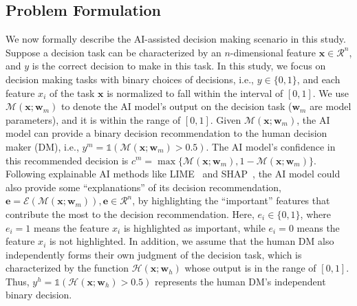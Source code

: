 \documentclass[letterpaper]{article} %
\begin{document}
\subsection{Problem Formulation}
We now formally describe the AI-assisted decision making scenario in this study. Suppose a decision task can be characterized by an $n$-dimensional feature $\bm{x} \in \mathcal{R}^{n}$, and $y$ is the correct decision to make in this task. In this study, we focus on decision making tasks with binary choices of decisions, i.e., $y \in \{0,1\}$, and each feature $x_i$ of the task $\bm{x}$ is normalized to fall within the interval of $[0,1]$. We use $\mathcal{M}(\bm{x};\bm{w}_m)$ to denote the AI model's output on the decision task ($\bm{w}_m$ are model parameters), and it is within the range of $[0,1]$. Given $\mathcal{M}(\bm{x};\bm{w}_m)$, the AI model can provide a binary decision recommendation to the human decision maker (DM), i.e., $y^m = \mathds{1}( \mathcal{M}(\bm{x};\bm{w}_m) > 0.5 )$. 
 The AI model's confidence in this recommended decision is $c^m = \max \{\mathcal{M}(\bm{x};\bm{w}_m), 1-\mathcal{M}(\bm{x};\bm{w}_m)\}$. Following explainable AI methods like LIME~\cite{ribeiro2016should} and SHAP~\cite{lundberg2017unified}, the AI model could also provide some ``explanations'' of its decision recommendation, $\bm{e} = \mathcal{E}(\mathcal{M}(\bm{x};\bm{w}_m)), \bm{e} \in \mathcal{R}^{n}$, by  
 highlighting the ``important'' features that contribute the most to the decision recommendation. Here, $e_i \in \{0,1\}$, where $e_i = 1$ means the feature $x_i$ is highlighted as important, while $e_i = 0$ means the feature $x_i$ is not highlighted.  In addition, we assume that the human DM also independently forms their own judgment of the decision task, which is characterized by the function $\mathcal{H}(\bm{x};\bm{w}_h)$ whose output is in the range of $[0,1]$.  Thus, $y^h = \mathds{1}( \mathcal{H}(\bm{x};\bm{w}_h) > 0.5 )$ represents the human DM's independent binary decision. 
\end{document}
